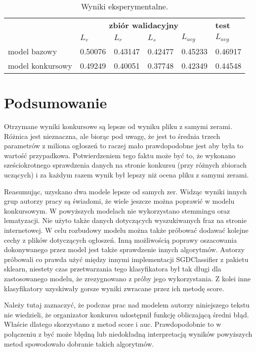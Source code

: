 \documentclass[a4paper,11pt]{article}
\begin{document}
\begin{table}[!ht]
\begin{center}
\begin{tabular}{l|llll|l}
  & \multicolumn{4}{c|}{\textbf{zbiór walidacyjny}} & \textbf{test} \\
  &   $L_{v}$   & $L_{r}$    &  $L_{s}$   & $L_{avg}$    & $L_{avg}$ \\
  \hline
model bazowy  & 0.50076 & 0.43147 &  0.42477 & 0.45233 & 0.46917 \\
model konkursowy & 0.49249 & 0.40051 &  0.37748 & 0.42349 & 0.44548
\end{tabular}
\end{center}
\caption{Wyniki eksperymentalne.}
\label{tab:problem_1}
\end{table}


\section{Podsumowanie}

Otrzymane wyniki konkursowe są lepsze od wyniku pliku z samymi zerami. Różnica jest nieznaczna, ale biorąc pod uwagę, że jest to średnia trzech parametrów z miliona ogłoszeń to raczej mało prawdopodobne jest aby była to wartość przypadkowa. Potwierdzeniem tego faktu może być to, że wykonano sześciokrotnego sprawdzenia danych na stronie konkursu (przy różnych zbiorach uczących) i za każdym razem wynik był lepszy niż ocena pliku z samymi zerami. 

Reasumując, uzyskano dwa modele lepsze od samych zer. Widząc wyniki innych grup autorzy pracy są świadomi, że wiele jeszcze można poprawić w modelu konkursowym. W powyższych modelach nie wykorzystano stemmingu oraz lematyzacji. Nie użyto także danych dotyczących wyszukiwanych fraz na stronie internetowej. W celu rozbudowy modelu można także próbować dodawać kolejne cechy z plików dotyczących ogłoszeń. Inną możliwością poprawy oszacowania dokonywanego przez model jest także sprawdzenie innych algorytmów. Autorzy próbowali co prawda użyć między innymi implementacji SGDClassifier z pakietu sklearn, niestety czas przetwarzania tego klasyfikatora był tak długi dla zastosowanego modelu, że zrezygnowano z próby jego wykorzystania. Z kolei inne klasyfikatory uzyskiwały gorsze wyniki zwracane przez ich metodę score. 

Należy tutaj zaznaczyć, że podczas prac nad modelem autorzy niniejszego tekstu nie wiedzieli, że organizator konkursu udostępnił funkcję obliczającą średni błąd. Właście dlatego skorzystano z metod score i auc. Prawdopodobnie to w połączeniu z być może błędną lub niedokładną interpretacją wyników powyższych metod spowodowało dobranie takich algorytmów.
\end{document}
